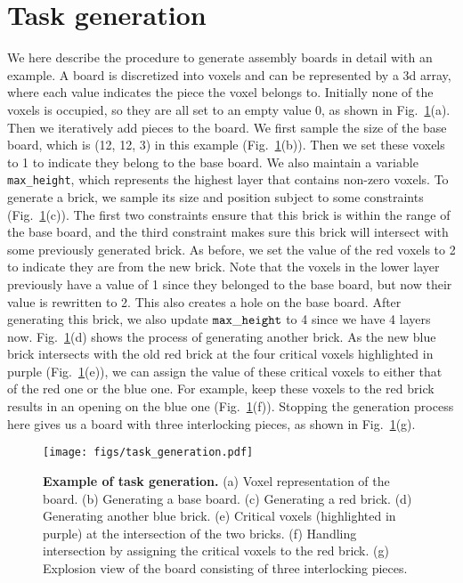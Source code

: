 \section{Task generation}\label{sec:app_task_gen}

We here describe the procedure to generate assembly boards in detail with an example. A board is discretized into voxels and can be represented by a 3d array, where each value indicates the piece the voxel belongs to. Initially none of the voxels is occupied, so they are all set to an empty value 0, as shown in Fig.~\ref{fig:task_gen}(a). Then we iteratively add pieces to the board. We first sample the size of the base board, which is (12, 12, 3) in this example (Fig.~\ref{fig:task_gen}(b)). Then we set these voxels to 1 to indicate they belong to the base board. We also maintain a variable {\tt max\_height}, which represents the highest layer that contains non-zero voxels. To generate a brick, we sample its size and position subject to some constraints (Fig.~\ref{fig:task_gen}(c)). The first two constraints ensure that this brick is within the range of the base board, and the third constraint makes sure this brick will intersect with some previously generated brick. As before, we set the value of the red voxels to 2 to indicate they are from the new brick. Note that the voxels in the lower layer previously have a value of 1 since they belonged to the base board, but now their value is rewritten to 2. This also creates a hole on the base board. After generating this brick, we also update ${\tt max\_height}$ to 4 since we have 4 layers now. Fig.~\ref{fig:task_gen}(d) shows the process of generating another brick. As the new blue brick intersects with the old red brick at the four critical voxels highlighted in purple (Fig.~\ref{fig:task_gen}(e)), we can assign the value of these critical voxels to either that of the red one or the blue one. For example, keep these voxels to the red brick results in an opening on the blue one (Fig.~\ref{fig:task_gen}(f)). Stopping the generation process here gives us a board with three interlocking pieces, as shown in Fig.~\ref{fig:task_gen}(g).


\begin{figure}[h!]
    \centering
    \texttt{[image: figs/task\_generation.pdf]}
    \caption{\textbf{Example of task generation.} (a) Voxel representation of the board. (b) Generating a base board. (c) Generating a red brick. (d) Generating another blue brick. (e) Critical voxels (highlighted in purple) at the intersection of the two bricks. (f) Handling intersection by assigning the critical voxels to the red brick. (g) Explosion view of the board consisting of three interlocking pieces.}
    \label{fig:task_gen}
\end{figure}

